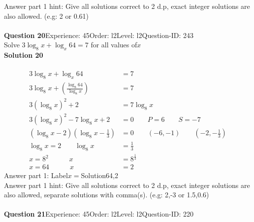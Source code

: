 \documentclass{article}
\begin{document}
Answer part 1 hint: \hspace{15pt}Give all solutions correct to 2 d.p, exact integer solutions are also allowed. (e.g: 2 or 0.61)\\
\\[4pt]
\noindent\textbf{Question 20}\hspace{20pt}Experience: 45\hspace{20pt}Order: l2\hspace{20pt}Level: l2\hspace{20pt}Question-ID: 243\\[2pt]
Solve $3\log_{8}x+\log_{x}64=7$ for all values of$x$\\[4pt]
\noindent\textbf{Solution 20}\\[2pt]
\\[-35pt]\begin{align*}
3\log_{8}x+\log_{x}64&=7\\[2pt]
3\log_{8}x+\left(\displaystyle\frac{\log_{8}64}{\log_{8}x}\right)&=7\\[2pt]
3(\log_{8}x)^2+2&=7\log_{8}x\\[2pt]
3(\log_{8}x)^2-7\log_{8}x+2&=0\qquad P=6 \qquad S=-7\\[2pt]
(\log_{8}x-2)\left(\log_{8}x-\displaystyle\frac{1}{3}\right)&=0\qquad (-6,-1)\qquad \left(-2,-\displaystyle\frac{1}{3}\right)\\[2pt]
\log_{8}x=2 \qquad \log_{8}x&=\displaystyle\frac{1}{3}\\[2pt]
x=8^2 \hspace{36pt} x&=8^{\frac{1}{3}}\\[2pt]
x=64 \hspace{36pt} x&=2
\end{align*}
Answer part 1: \hspace{10pt}Label\hspace{10pt}$x=$\hspace{10pt}Solution\hspace{10pt}64,2\\
Answer part 1 hint: \hspace{15pt}Give all solutions correct to 2 d.p, exact integer solutions are also allowed, separate solutions with comma(s). (e.g: 2,-3 or 1.5,0.6)\\
\\[4pt]
\noindent\textbf{Question 21}\hspace{20pt}Experience: 45\hspace{20pt}Order: l2\hspace{20pt}Level: l2\hspace{20pt}Question-ID: 220\\[2pt]
\end{document}
